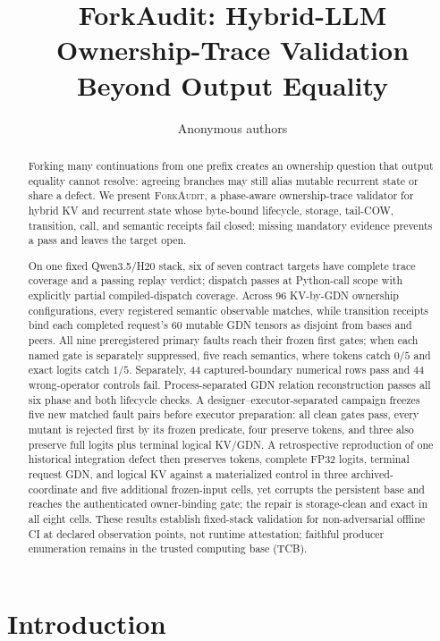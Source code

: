 \documentclass{article}
\title{ForkAudit: Hybrid-LLM Ownership-Trace Validation Beyond Output Equality}
\author{Anonymous authors}
\newcommand{\method}{\textsc{ForkAudit}}
\begin{document}
\raggedbottom
\maketitle

\begin{abstract}
Forking many continuations from one prefix creates an ownership question that
output equality cannot resolve: agreeing branches may still alias mutable
recurrent state or share a defect.  We present \method{}, a phase-aware
ownership-trace validator for hybrid KV and recurrent state whose byte-bound
lifecycle, storage, tail-COW, transition, call, and semantic receipts fail
closed: missing mandatory evidence prevents a pass and leaves the target open.

On one fixed Qwen3.5/H20 stack, six of seven contract targets have complete
trace coverage and a passing replay verdict; dispatch passes at Python-call
scope with explicitly partial compiled-dispatch coverage.  Across 96 KV-by-GDN
ownership configurations, every registered semantic observable matches, while
transition receipts bind each completed request's 60 mutable GDN tensors as
disjoint from bases and peers.  All nine preregistered primary faults reach their frozen
first gates; when each named gate is separately suppressed, five reach
semantics, where tokens catch $0/5$ and exact logits catch $1/5$.
Separately, 44 captured-boundary numerical rows pass and 44 wrong-operator
controls fail.  Process-separated GDN relation reconstruction passes all six
phase and both lifecycle checks.  A designer--executor-separated campaign
freezes five new matched fault pairs before executor preparation: all clean
gates pass, every mutant is rejected first by its frozen predicate, four
preserve tokens, and three also preserve full logits plus terminal logical
KV/GDN.  A retrospective reproduction of one historical integration defect
then preserves tokens, complete FP32 logits, terminal request GDN, and logical
KV against a materialized control in three archived-coordinate and five
additional frozen-input cells, yet corrupts the persistent base and reaches
the authenticated owner-binding gate; the repair is storage-clean and exact
in all eight cells.  These results establish fixed-stack validation for non-adversarial
offline CI at declared observation points, not runtime attestation; faithful
producer enumeration remains in the trusted computing base (TCB).
\end{abstract}

\section{Introduction}
\label{sec:intro}
\end{document}
